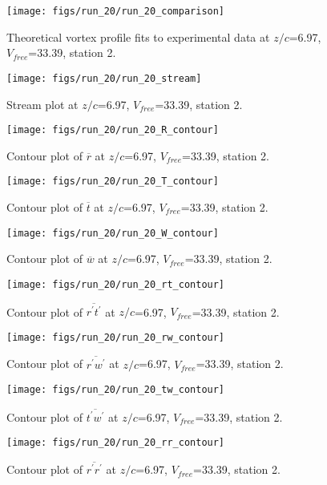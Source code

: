 \begin{figure}[H]
\centering
\texttt{[image: figs/run\_20/run\_20\_comparison]}
\caption{Theoretical vortex profile fits to experimental data at $z/c$=6.97, $V_{free}$=33.39, station 2.}
\end{figure}


\begin{figure}[H]
\centering
\texttt{[image: figs/run\_20/run\_20\_stream]}
\caption{Stream plot at $z/c$=6.97, $V_{free}$=33.39, station 2.}
\end{figure}


\begin{figure}[H]
\centering
\texttt{[image: figs/run\_20/run\_20\_R\_contour]}
\caption{Contour plot of $\overline{r}$ at $z/c$=6.97, $V_{free}$=33.39, station 2.}
\end{figure}


\begin{figure}[H]
\centering
\texttt{[image: figs/run\_20/run\_20\_T\_contour]}
\caption{Contour plot of $\overline{t}$ at $z/c$=6.97, $V_{free}$=33.39, station 2.}
\end{figure}


\begin{figure}[H]
\centering
\texttt{[image: figs/run\_20/run\_20\_W\_contour]}
\caption{Contour plot of $\overline{w}$ at $z/c$=6.97, $V_{free}$=33.39, station 2.}
\end{figure}


\begin{figure}[H]
\centering
\texttt{[image: figs/run\_20/run\_20\_rt\_contour]}
\caption{Contour plot of $\overline{r^\prime t^\prime}$ at $z/c$=6.97, $V_{free}$=33.39, station 2.}
\end{figure}


\begin{figure}[H]
\centering
\texttt{[image: figs/run\_20/run\_20\_rw\_contour]}
\caption{Contour plot of $\overline{r^\prime w^\prime}$ at $z/c$=6.97, $V_{free}$=33.39, station 2.}
\end{figure}


\begin{figure}[H]
\centering
\texttt{[image: figs/run\_20/run\_20\_tw\_contour]}
\caption{Contour plot of $\overline{t^\prime w^\prime}$ at $z/c$=6.97, $V_{free}$=33.39, station 2.}
\end{figure}


\begin{figure}[H]
\centering
\texttt{[image: figs/run\_20/run\_20\_rr\_contour]}
\caption{Contour plot of $\overline{r^\prime r^\prime}$ at $z/c$=6.97, $V_{free}$=33.39, station 2.}
\end{figure}


